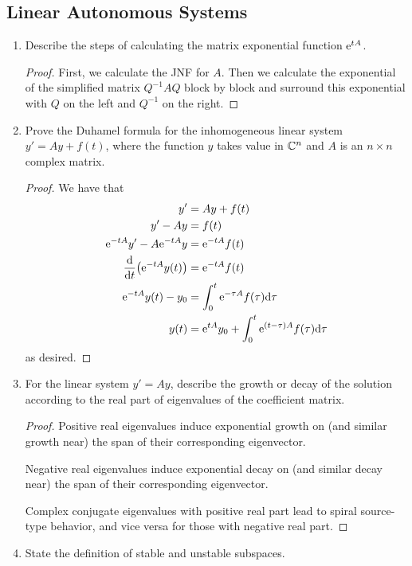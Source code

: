 \documentclass[../psets.tex]{subfiles}
\begin{document}
\subsection*{Linear Autonomous Systems}
\begin{enumerate}
    \item Describe the steps of calculating the matrix exponential function $\e[tA]$.
    \begin{proof}
        First, we calculate the JNF for $A$. Then we calculate the exponential of the simplified matrix $Q^{-1}AQ$ block by block and surround this exponential with $Q$ on the left and $Q^{-1}$ on the right.
    \end{proof}
    \item Prove the Duhamel formula for the inhomogeneous linear system $y'=Ay+f(t)$, where the function $y$ takes value in $\C^n$ and $A$ is an $n\times n$ complex matrix.
    \begin{proof}
        We have that
        \begin{align*}
            y' &= Ay+f(t)\\
            y'-Ay &= f(t)\\
            \e[-tA]y'-A\e[-tA]y &= \e[-tA]f(t)\\
            \dv{t}(\e[-tA]y(t)) &= \e[-tA]f(t)\\
            \e[-tA]y(t)-y_0 &= \int_0^t\e[-\tau A]f(\tau)\dd\tau\\
            y(t) &= \e[tA]y_0+\int_0^t\e[(t-\tau)A]f(\tau)\dd\tau
        \end{align*}
        as desired.
    \end{proof}
    \item For the linear system $y'=Ay$, describe the growth or decay of the solution according to the real part of eigenvalues of the coefficient matrix.
    \begin{proof}
        Positive real eigenvalues induce exponential growth on (and similar growth near) the span of their corresponding eigenvector.\par
        Negative real eigenvalues induce exponential decay on (and similar decay near) the span of their corresponding eigenvector.\par
        Complex conjugate eigenvalues with positive real part lead to spiral source-type behavior, and vice versa for those with negative real part.
    \end{proof}
    \item State the definition of stable and unstable subspaces.

\end{enumerate}
\end{document}
